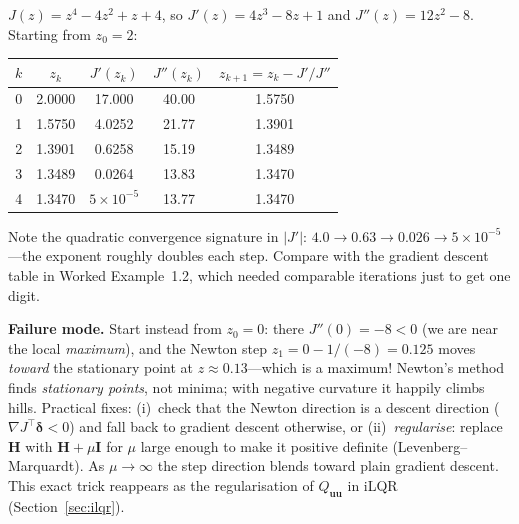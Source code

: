 \documentclass[11pt,twoside]{report}
\theoremstyle{definition}
\theoremstyle{plain}
\theoremstyle{remark}
\newcommand{\uu}{\bm{u}}
\newcommand{\0}{\bm{0}}
\newcommand{\I}{\bm{I}}
\begin{document}
\begin{examplebox}
$J(z)=z^{4}-4z^{2}+z+4$, so $J'(z)=4z^{3}-8z+1$ and $J''(z)=12z^{2}-8$.
Starting from $z_{0}=2$:
\begin{center}
\begin{tabular}{ccccc}
\toprule
$k$ & $z_{k}$ & $J'(z_{k})$ & $J''(z_{k})$ & $z_{k+1}=z_{k}-J'/J''$\\
\midrule
0 & 2.0000 & 17.000 & 40.00 & 1.5750\\
1 & 1.5750 & 4.0252 & 21.77 & 1.3901\\
2 & 1.3901 & 0.6258 & 15.19 & 1.3489\\
3 & 1.3489 & 0.0264 & 13.83 & 1.3470\\
4 & 1.3470 & $5\!\times\!10^{-5}$ & 13.77 & 1.3470\\
\bottomrule
\end{tabular}
\end{center}
Note the quadratic convergence signature in $|J'|$:
$4.0\to 0.63\to 0.026\to 5\!\times\!10^{-5}$---the exponent roughly
doubles each step. Compare with the gradient descent table in Worked
Example~1.2, which needed comparable iterations just to get one digit.

\textbf{Failure mode.} Start instead from $z_{0}=0$: there
$J''(0)=-8<0$ (we are near the local \emph{maximum}), and the Newton step
$z_{1}=0-1/(-8)=0.125$ moves \emph{toward} the stationary point at
$z\approx 0.13$---which is a maximum! Newton's method finds
\emph{stationary points}, not minima; with negative curvature it happily
climbs hills. Practical fixes: (i)~check that the Newton direction is a
descent direction ($\nabla J^{\!\top}\bm{\delta}<0$) and fall back to
gradient descent otherwise, or (ii)~\emph{regularise}: replace $\bm{H}$
with $\bm{H}+\mu\I$ for $\mu$ large enough to make it positive definite
(Levenberg--Marquardt). As $\mu\to\infty$ the step direction blends
toward plain gradient descent. This exact trick reappears as the
regularisation of $Q_{\uu\uu}$ in iLQR (Section~\ref{sec:ilqr}).
\end{examplebox}
\end{document}
